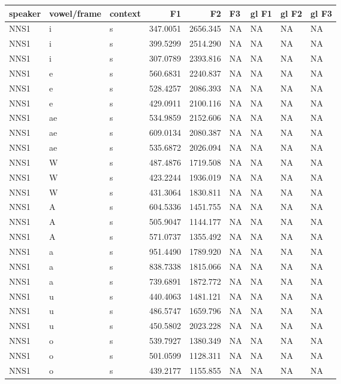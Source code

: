 \documentclass[man, fleqn, noextraspace]{apa6}
\begin{document}
\begin{tabular}{l|l|l|r|r|l|l|l|l}
\hline
speaker & vowel/frame & context & F1 & F2 & F3 & gl F1 & gl F2 & gl F3\\
\hline
NNS1 & i & s & 347.0051 & 2656.345 & NA & NA & NA & NA\\
\hline
NNS1 & i & s & 399.5299 & 2514.290 & NA & NA & NA & NA\\
\hline
NNS1 & i & s & 307.0789 & 2393.816 & NA & NA & NA & NA\\
\hline
NNS1 & e & s & 560.6831 & 2240.837 & NA & NA & NA & NA\\
\hline
NNS1 & e & s & 528.4257 & 2086.393 & NA & NA & NA & NA\\
\hline
NNS1 & e & s & 429.0911 & 2100.116 & NA & NA & NA & NA\\
\hline
NNS1 & ae & s & 534.9859 & 2152.606 & NA & NA & NA & NA\\
\hline
NNS1 & ae & s & 609.0134 & 2080.387 & NA & NA & NA & NA\\
\hline
NNS1 & ae & s & 535.6872 & 2026.094 & NA & NA & NA & NA\\
\hline
NNS1 & W & s & 487.4876 & 1719.508 & NA & NA & NA & NA\\
\hline
NNS1 & W & s & 423.2244 & 1936.019 & NA & NA & NA & NA\\
\hline
NNS1 & W & s & 431.3064 & 1830.811 & NA & NA & NA & NA\\
\hline
NNS1 & A & s & 604.5336 & 1451.755 & NA & NA & NA & NA\\
\hline
NNS1 & A & s & 505.9047 & 1144.177 & NA & NA & NA & NA\\
\hline
NNS1 & A & s & 571.0737 & 1355.492 & NA & NA & NA & NA\\
\hline
NNS1 & a & s & 951.4490 & 1789.920 & NA & NA & NA & NA\\
\hline
NNS1 & a & s & 838.7338 & 1815.066 & NA & NA & NA & NA\\
\hline
NNS1 & a & s & 739.6891 & 1872.772 & NA & NA & NA & NA\\
\hline
NNS1 & u & s & 440.4063 & 1481.121 & NA & NA & NA & NA\\
\hline
NNS1 & u & s & 486.5747 & 1659.796 & NA & NA & NA & NA\\
\hline
NNS1 & u & s & 450.5802 & 2023.228 & NA & NA & NA & NA\\
\hline
NNS1 & o & s & 539.7927 & 1380.349 & NA & NA & NA & NA\\
\hline
NNS1 & o & s & 501.0599 & 1128.311 & NA & NA & NA & NA\\
\hline
NNS1 & o & s & 439.2177 & 1155.855 & NA & NA & NA & NA\\

\end{tabular}
\end{document}
